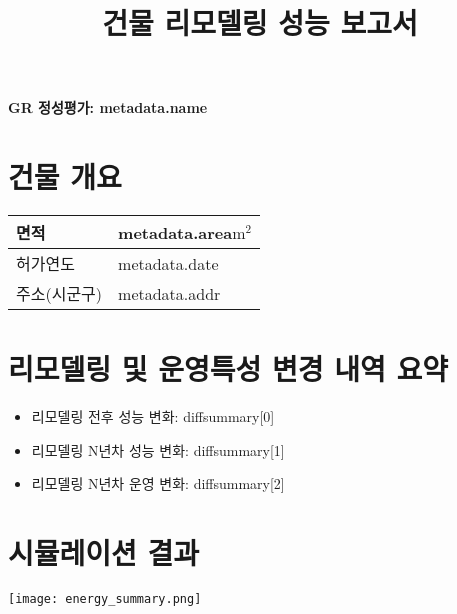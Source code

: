 \documentclass[a4paper,10pt]{article}
\title{건물 리모델링 성능 보고서}
\begin{document}
\begin{center}
    \Large\bfseries GR 정성평가: {{metadata.name}}
\end{center}


\section{건물 개요}


\setlength{\tabcolsep}{0pt}
\renewcommand{\arraystretch}{1.3}

\begin{table}[h!]
\centering
\begin{tabular}{L|C}
\hline
면적 & {{metadata.area}}$\mathrm{m^2}$ \\ \hline
허가연도 & {{metadata.date}} \\ \hline
주소(시군구) & {{metadata.addr}} \\ \hline
\end{tabular}
\end{table}

\section{리모델링 및 운영특성 변경 내역 요약}
\begin{itemize}
    \item 리모델링 전후 성능 변화: {{diffsummary[0]}}
    \item 리모델링 N년차 성능 변화: {{diffsummary[1]}}
    \item 리모델링 N년차 운영 변화: {{diffsummary[2]}}
\end{itemize}

\section{시뮬레이션 결과}
\begin{center}
  \texttt{[image: energy\_summary.png]}
\end{center}
\end{document}
